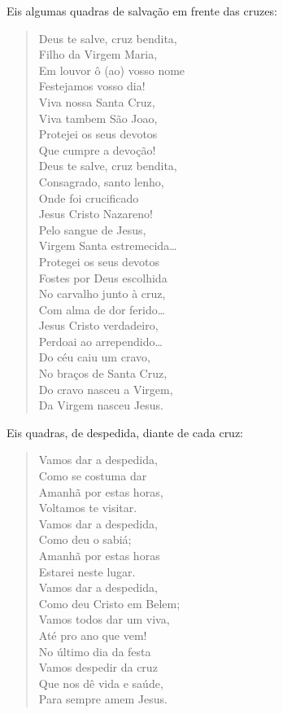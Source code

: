 Eis algumas quadras de salvação em frente das cruzes:

\begin{verse}
Deus te salve, cruz bendita,\\
Filho da Virgem Maria,\\
Em louvor ô (ao) vosso nome\\
Festejamos vosso dia!\\[5pt]
Viva nossa Santa Cruz,\\
Viva tambem São Joao,\\
Protejei os seus devotos\\
Que cumpre a devoção!\\[5pt]
Deus te salve, cruz bendita,\\
Consagrado, santo lenho,\\
Onde foi crucificado\\
Jesus Cristo Nazareno!\\[5pt]
Pelo sangue de Jesus,\\
Virgem Santa estremecida\ldots{}\\
Protegei os seus devotos\\
Fostes por Deus escolhida\\[5pt]
No carvalho junto à cruz,\\
Com alma de dor ferido\ldots{}\\
Jesus Cristo verdadeiro,\\
Perdoai ao arrependido\ldots{}\\[5pt]
Do céu caiu um cravo,\\
No braços de Santa Cruz,\\
Do cravo nasceu a Virgem,\\
Da Virgem nasceu Jesus.\\
\end{verse}

Eis quadras, de despedida, diante de cada cruz:

\begin{verse}
Vamos dar a despedida,\\
Como se costuma dar\\
Amanhã por estas horas,\\
Voltamos te visitar.\\[5pt]
Vamos dar a despedida,\\
Como deu o sabiá;\\
Amanhã por estas horas\\
Estarei neste lugar.\\[5pt]
Vamos dar a despedida,\\
Como deu Cristo em Belem;\\
Vamos todos dar um viva,\\
Até pro ano que vem!\\[5pt]
No último dia da festa\\
Vamos despedir da cruz\\
Que nos dê vida e saúde,\\
Para sempre amem Jesus.
\end{verse}

